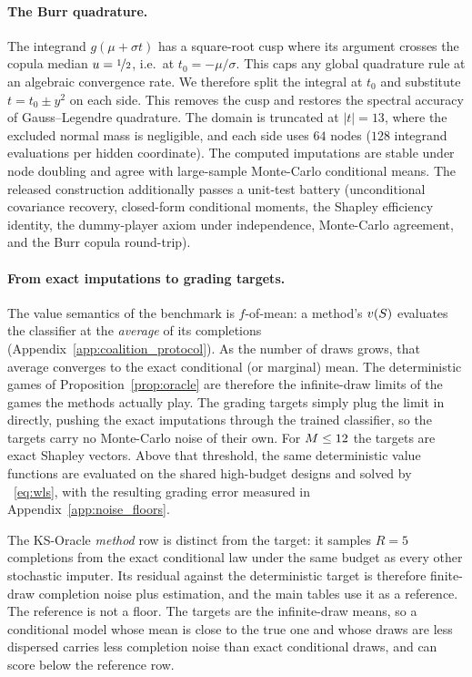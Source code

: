 \paragraph{The Burr quadrature.}
The integrand $g(\mu + \sigma t)$ has a square-root cusp where its argument
crosses the copula median $u = \nicefrac{1}{2}$, i.e.\ at $t_0 = -\mu/\sigma$.
This caps any global quadrature rule at an algebraic convergence rate.  We
therefore split the integral at $t_0$ and substitute $t = t_0 \pm y^2$ on
each side.  This removes the cusp and restores the spectral accuracy of
Gauss--Legendre quadrature.  The domain is truncated at $|t| = 13$, where the
excluded normal mass is negligible, and each side uses $64$ nodes ($128$
integrand evaluations per hidden coordinate).  The computed imputations are stable
under node doubling and agree with large-sample Monte-Carlo conditional
means.  The released construction additionally passes a unit-test battery
(unconditional covariance recovery, closed-form conditional moments,
the Shapley efficiency identity, the dummy-player axiom under independence,
Monte-Carlo agreement, and the Burr copula round-trip).

\paragraph{From exact imputations to grading targets.}
The value semantics of the benchmark is $f$-of-mean: a method's
$v(S)$ evaluates the classifier at the \emph{average} of its
completions (Appendix~\ref{app:coalition_protocol}).  As the number of draws
grows, that average converges to the exact conditional (or marginal) mean.
The deterministic games of Proposition~\ref{prop:oracle} are therefore the
infinite-draw limits of the games the methods actually play.  The grading
targets simply plug the limit in directly, pushing the exact imputations through
the trained classifier, so the targets carry no Monte-Carlo noise of their
own.  For $M \leq 12$ the targets are exact Shapley vectors.  Above that
threshold, the same deterministic value functions are evaluated on the
shared high-budget designs and solved by ~\eqref{eq:wls}, with the
resulting grading error measured in Appendix~\ref{app:noise_floors}.

The KS-Oracle \emph{method} row is distinct from the target: it samples
$R{=}5$ completions from the exact conditional law under the same budget as
every other stochastic imputer.  Its residual against the deterministic target
is therefore finite-draw completion noise plus estimation, and the main
tables use it as a reference.  The reference is not a floor.  The targets
are the infinite-draw means, so a conditional model whose mean is close to
the true one and whose draws are less dispersed carries less completion
noise than exact conditional draws, and can score below the reference
row.

